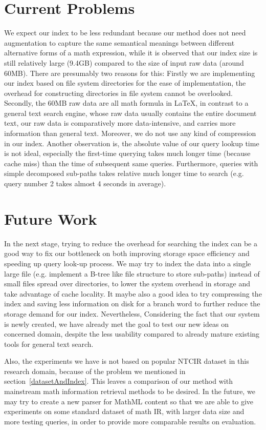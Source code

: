 \section{Current Problems}
We expect our index to be less redundant because our method does not need augmentation to capture the same semantical meanings between different alternative forms of a math expression,
while it is observed that our index size is still relatively large (9.4GB) compared to the size of input raw data (around 60MB).
There are presumably two reasons for this: 
Firstly we are implementing our index based on file system directories for the ease of implementation, the overhead for constructing directories in file system cannot be overlooked. 
Secondly, the 60MB raw data are all math formula in \LaTeX,	in contrast to a general text search engine, whose raw data usually contains the entire document text, our raw data is comparatively more data-intensive, and carries more information than general text. 
Moreover, we do not use any kind of compression in our index.
Another observation is, the absolute value of our query lookup time is not ideal, especially
the first-time querying takes much longer time (because cache miss) than the time of subsequent same queries. 
Furthermore, queries with simple decomposed sub-paths takes relative much longer time to search (e.g. query number 2 takes almost 4 seconds in average). 

\section{Future Work}
In the next stage, trying to reduce the overhead for searching the index can be a good way to fix our bottleneck on both improving storage space efficiency and speeding up query look-up process. 
We may try to index the data into a single large file (e.g. implement a B-tree like file structure to store sub-paths) instead of small files spread over directories, to lower the system overhead in storage and take advantage of cache locality. 
It maybe also a good idea to try compressing the index and saving less information on disk for a branch word to further reduce the storage demand for our index.
Nevertheless, Considering the fact that our system is newly created, we have already met the goal to test our new ideas on concerned domain, despite the less usability compared to already mature existing tools for general text search.

Also, the experiments we have is not based on popular NTCIR dataset in this research domain, because of the problem we mentioned in section~\ref{datasetAndIndex}. 
This leaves a comparison of our method with mainstream math information retrieval methods to be desired.  
In the future, we may try to create a new parser for MathML content so that we are able to give experiments on some standard dataset of math IR, with larger data size and more testing queries, in order to provide more comparable results on evaluation.

